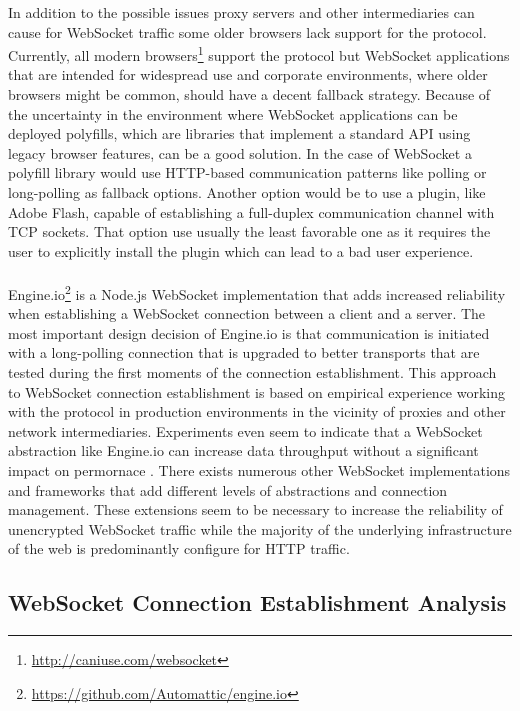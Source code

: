 In addition to the possible issues proxy servers and other intermediaries can cause for WebSocket traffic some older browsers lack support for the protocol. Currently, all modern browsers\footnote{\url{http://caniuse.com/websocket}} support the protocol but WebSocket applications that are intended for widespread use and corporate environments, where older browsers might be common, should have a decent fallback strategy. Because of the uncertainty in the environment where WebSocket applications can be deployed polyfills, which are libraries that implement a standard API using legacy browser features, can be a good solution. In the case of WebSocket a polyfill library would use HTTP-based communication patterns like polling or long-polling as fallback options. Another option would be to use a plugin, like Adobe Flash, capable of establishing a full-duplex communication channel with TCP sockets. That option use usually the least favorable one as it requires the user to explicitly install the plugin which can lead to a bad user experience.
\\ \\
Engine.io\footnote{\url{https://github.com/Automattic/engine.io}} is a Node.js WebSocket implementation that adds increased reliability when establishing a WebSocket connection between a client and a server. The most important design decision of Engine.io is that communication is initiated with a long-polling connection that is upgraded to better transports that are tested during the first moments of the connection establishment. This approach to WebSocket connection establishment is based on empirical experience working with the protocol in production environments in the vicinity of proxies and other network intermediaries. Experiments even seem to indicate that a WebSocket abstraction like Engine.io can increase data throughput without a significant impact on permornace \cite{ozger2014websocket}. There exists numerous other WebSocket implementations and frameworks that add different levels of abstractions and connection management. These extensions seem to be necessary to increase the reliability of unencrypted WebSocket traffic while the majority of the underlying infrastructure of the web is predominantly configure for HTTP traffic.

\subsection{WebSocket Connection Establishment Analysis}

